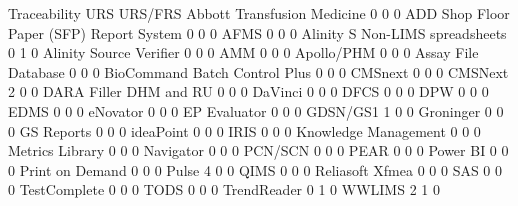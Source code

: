 \documentclass{article}
\begin{document}
\begin{Schunk}
\begin{Soutput}
                                           Traceability URS URS/FRS
  Abbott Transfusion Medicine                         0   0       0
  ADD Shop Floor Paper (SFP) Report System            0   0       0
  AFMS                                                0   0       0
  Alinity S Non-LIMS spreadsheets                     0   1       0
  Alinity Source Verifier                             0   0       0
  AMM                                                 0   0       0
  Apollo/PHM                                          0   0       0
  Assay File Database                                 0   0       0
  BioCommand Batch Control Plus                       0   0       0
  CMSnext                                             0   0       0
  CMSNext                                             2   0       0
  DARA Filler DHM and RU                              0   0       0
  DaVinci                                             0   0       0
  DFCS                                                0   0       0
  DPW                                                 0   0       0
  EDMS                                                0   0       0
  eNovator                                            0   0       0
  EP Evaluator                                        0   0       0
  GDSN/GS1                                            1   0       0
  Groninger                                           0   0       0
  GS Reports                                          0   0       0
  ideaPoint                                           0   0       0
  IRIS                                                0   0       0
  Knowledge Management                                0   0       0
  Metrics Library                                     0   0       0
  Navigator                                           0   0       0
  PCN/SCN                                             0   0       0
  PEAR                                                0   0       0
  Power BI                                            0   0       0
  Print on Demand                                     0   0       0
  Pulse                                               4   0       0
  QIMS                                                0   0       0
  Reliasoft Xfmea                                     0   0       0
  SAS                                                 0   0       0
  TestComplete                                        0   0       0
  TODS                                                0   0       0
  TrendReader                                         0   1       0
  WWLIMS                                              2   1       0


\end{Soutput}
\end{Schunk}
\end{document}
